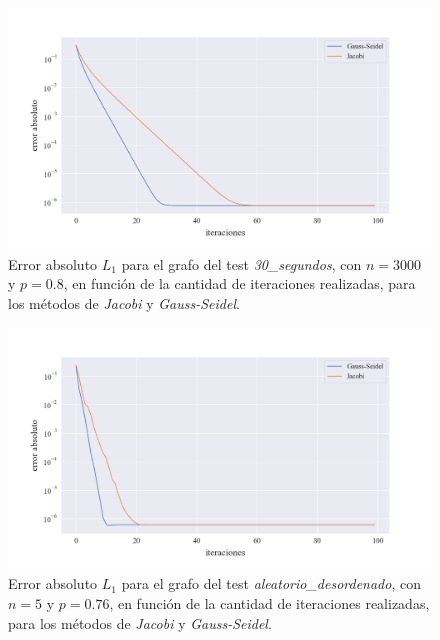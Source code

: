 \newpage
\begin{figure}[!htbp]
    \centering
    \includegraphics[width=1\textwidth, trim=0 0 0 30]{files/src/.media/convergencia_test_30_segundos.png}
    \caption{Error absoluto $L_1$ para el grafo del test \textit{30\_segundos}, con $n = 3000$ y $p = 0.8$, en función de la cantidad de iteraciones realizadas, para los métodos de \textit{Jacobi} y \textit{Gauss-Seidel}.} \label{test_30_segundos}
\end{figure}

\begin{figure}[!htbp]
    \centering
    \includegraphics[width=1\textwidth, trim=0 0 0 30]{files/src/.media/convergencia_test_aleatorio_desordenado.png}
    \caption{Error absoluto $L_1$ para el grafo del test \textit{aleatorio\_desordenado}, con $n = 5$ y $p = 0.76$, en función de la cantidad de iteraciones realizadas, para los métodos de \textit{Jacobi} y \textit{Gauss-Seidel}.} \label{test_aleatorio_desordenado}
\end{figure}

